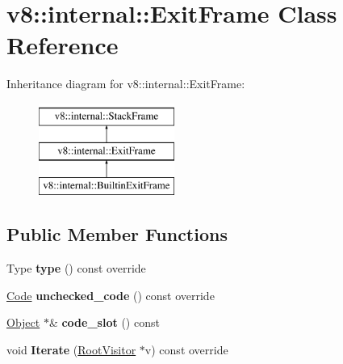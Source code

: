 \hypertarget{classv8_1_1internal_1_1ExitFrame}{}\section{v8\+:\+:internal\+:\+:Exit\+Frame Class Reference}
\label{classv8_1_1internal_1_1ExitFrame}
Inheritance diagram for v8\+:\+:internal\+:\+:Exit\+Frame\+:\begin{figure}[H]
\begin{center}
\leavevmode
\includegraphics[height=3.000000cm]{classv8_1_1internal_1_1ExitFrame}
\end{center}
\end{figure}
\subsection*{Public Member Functions}
\begin{DoxyCompactItemize}
\item 
\mbox{\label{classv8_1_1internal_1_1ExitFrame_a260050026dbc797863485faea19fa023}} 
Type {\bfseries type} () const override
\item 
\mbox{\label{classv8_1_1internal_1_1ExitFrame_a8f7eb407270631cffcca94b75ec4917f}} 
\mbox{\hyperlink{classv8_1_1internal_1_1Code}{Code}} {\bfseries unchecked\+\_\+code} () const override
\item 
\mbox{\label{classv8_1_1internal_1_1ExitFrame_af9ae5ef4184f0cd194457f7ebce59448}} 
\mbox{\hyperlink{classv8_1_1internal_1_1Object}{Object}} $\ast$\& {\bfseries code\+\_\+slot} () const
\item 
\mbox{\label{classv8_1_1internal_1_1ExitFrame_a557476490b1e874bfeb69da5991820e1}} 
void {\bfseries Iterate} (\mbox{\hyperlink{classv8_1_1internal_1_1RootVisitor}{Root\+Visitor}} $\ast$v) const override
\end{DoxyCompactItemize}
